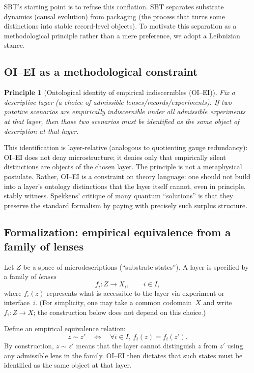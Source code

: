 \documentclass[11pt]{article}
\newtheorem{principle}{Principle}
\begin{document}
SBT's starting point is to refuse this conflation. SBT separates substrate dynamics (causal evolution) from packaging (the process that turns some distinctions into stable record-level objects). To motivate this separation as a methodological principle rather than a mere preference, we adopt a Leibnizian stance.

\subsection{OI--EI as a methodological constraint}

\begin{principle}[Ontological identity of empirical indiscernibles (OI--EI)]
Fix a descriptive layer (a choice of admissible lenses/records/experiments). If two putative scenarios are empirically indiscernible under \emph{all} admissible experiments at that layer, then those two scenarios must be identified as the same object of description at that layer.
\end{principle}

This identification is layer-relative (analogous to quotienting gauge redundancy): OI--EI does not deny microstructure; it denies only that empirically silent distinctions are objects of the chosen layer.
The principle is not a metaphysical postulate. Rather, OI--EI is a constraint on theory language: one should not build into a layer's ontology distinctions that the layer itself cannot, even in principle, stably witness. Spekkens' critique of many quantum ``solutions'' is that they preserve the standard formalism by paying with precisely such surplus structure.

\subsection{Formalization: empirical equivalence from a family of lenses}

Let $Z$ be a space of microdescriptions (``substrate states''). A layer is specified by a family of \emph{lenses}
\[
 f_i : Z \to X_i,\qquad i\in I,
\]
where $f_i(z)$ represents what is accessible to the layer via experiment or interface~$i$.
(For simplicity, one may take a common codomain~$X$ and write $f_i : Z\to X$; the construction below does not depend on this choice.)

Define an empirical equivalence relation:
\[
 z \sim z' \quad\Longleftrightarrow\quad \forall i\in I,\ f_i(z)=f_i(z').
\]
By construction, $z\sim z'$ means that the layer cannot distinguish $z$ from $z'$ using any admissible lens in the family. OI--EI then dictates that such states must be identified as the same object at that layer.
\end{document}
